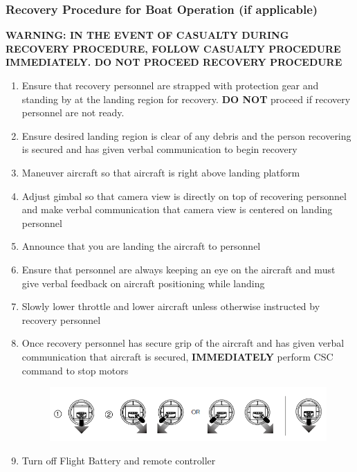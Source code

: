 \subsubsection{Recovery Procedure for Boat Operation (if applicable)}
\textbf{WARNING: IN THE EVENT OF CASUALTY DURING RECOVERY PROCEDURE, FOLLOW CASUALTY PROCEDURE IMMEDIATELY. DO NOT PROCEED RECOVERY PROCEDURE}
\begin{enumerate}
\setlength{\itemsep}{0em}
\setlength{\parskip}{0em}
\item Ensure that recovery personnel are strapped with protection gear and standing by at the landing region for recovery. \textbf{DO NOT} proceed if recovery personnel are not ready.
\item Ensure desired landing region is clear of any debris and the person recovering is secured and has given verbal communication to begin recovery
\item Maneuver aircraft so that aircraft is right above landing platform 
\item Adjust gimbal so that camera view is directly on top of recovering personnel and make verbal communication that camera view is centered on landing personnel
\item Announce that you are landing the aircraft to personnel
\item Ensure that personnel are always keeping an eye on the aircraft and must give verbal feedback on aircraft positioning while landing
\item Slowly lower throttle and lower aircraft unless otherwise instructed by recovery personnel
\item Once recovery personnel has secure grip of the aircraft and has given verbal communication that aircraft is secured, \textbf{IMMEDIATELY} perform CSC command to stop motors
\begin{figure}[h]
\begin{center}
\includegraphics[width=\columnwidth]{figures/op6.png}
\end{center}
\end{figure}  
\item Turn off Flight Battery and remote controller
\end{enumerate}



